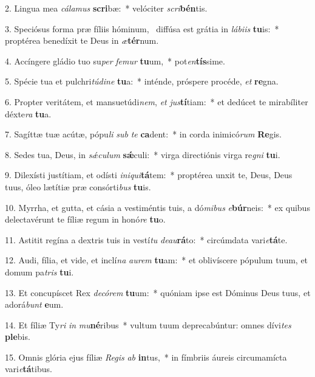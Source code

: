 2. Lingua mea \textit{cá}\textit{la}\textit{mus} \textbf{scri}bæ:~*  velóciter \textit{scri}\textbf{bén}tis.\

3. Speciósus forma præ fíliis hóminum, \dag\  diffúsa est grátia in \textit{lá}\textit{bi}\textit{is} \textbf{tu}is:~*  proptérea benedíxit te Deus in \textit{æ}\textbf{tér}num.\

4. Accíngere gládio tuo su\textit{per} \textit{fe}\textit{mur} \textbf{tu}um,~*  pot\textit{en}\textbf{tís}sime.\

5. Spécie tua et pulchri\textit{tú}\textit{di}\textit{ne} \textbf{tu}a:~*  inténde, próspere procéde, \textit{et} \textbf{re}gna.\

6. Propter veritátem, et mansuetúdi\textit{nem}, \textit{et} \textit{jus}\textbf{tí}tiam:~*  et dedúcet te mirabíliter déxte\textit{ra} \textbf{tu}a.\

7. Sagíttæ tuæ acútæ, pópu\textit{li} \textit{sub} \textit{te} \textbf{ca}dent:~*  in corda inimicó\textit{rum} \textbf{Re}gis.\

8. Sedes tua, Deus, in \textit{sǽ}\textit{cu}\textit{lum} \textbf{sǽ}culi:~*  virga directiónis virga re\textit{gni} \textbf{tu}i.\

9. Dilexísti justítiam, et odísti \textit{in}\textit{i}\textit{qui}\textbf{tá}tem:~*  proptérea unxit te, Deus, Deus tuus, óleo lætítiæ præ consórti\textit{bus} \textbf{tu}is.\

10. Myrrha, et gutta, et cásia a vestiméntis tuis, a dó\textit{mi}\textit{bus} \textit{e}\textbf{búr}neis:~*  ex quibus delectavérunt te fíliæ regum in honó\textit{re} \textbf{tu}o.\

11. Astitit regína a dextris tuis in vestí\textit{tu} \textit{de}\textit{au}\textbf{rá}to:~*  circúmdata vari\textit{e}\textbf{tá}te.\

12. Audi, fília, et vide, et inclí\textit{na} \textit{au}\textit{rem} \textbf{tu}am:~*  et oblivíscere pópulum tuum, et domum pa\textit{tris} \textbf{tu}i.\

13. Et concupíscet Rex \textit{de}\textit{có}\textit{rem} \textbf{tu}um:~*  quóniam ipse est Dóminus Deus tuus, et adorá\textit{bunt} \textbf{e}um.\

14. Et fíliæ Ty\textit{ri} \textit{in} \textit{mu}\textbf{né}ribus~*  vultum tuum deprecabúntur: omnes dívi\textit{tes} \textbf{ple}bis.\

15. Omnis glória ejus fíliæ \textit{Re}\textit{gis} \textit{ab} \textbf{in}tus,~*  in fímbriis áureis circumamícta vari\textit{e}\textbf{tá}tibus.\

